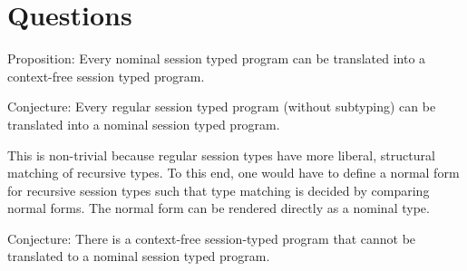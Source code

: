 \section{Questions}
\label{sec:questions}

Proposition: Every nominal session typed program can be translated into a
context-free session typed program.

Conjecture: Every regular session typed program (without subtyping)
can be translated into a nominal session typed program.

This is non-trivial because regular session types
have more liberal, structural matching of recursive types. To this
end, one would have to define a normal form for recursive session
types such that type matching is decided by comparing normal
forms. The normal form can be rendered directly as a nominal type.

Conjecture: There is a context-free session-typed program that cannot
be translated to a nominal session typed program.

